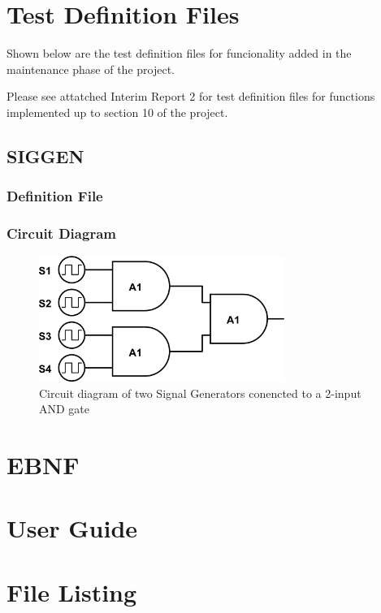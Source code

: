 \documentclass[a4paper,10pt]{article}
\begin{document}
\section{Test Definition Files}

Shown below are the test definition files for funcionality added in the maintenance phase of the project.

Please see attatched Interim Report 2 for test definition files for functions implemented up to section 10 of the project.

\subsection{SIGGEN}

\subsubsection{Definition File}


\subsubsection{Circuit Diagram}
\begin{figure}[h]
 \centering
 \includegraphics[width=8cm]{../../examples/siggen.png}
 \caption{Circuit diagram of two Signal Generators conencted to a 2-input AND gate}
 \label{fig:example-xor}
\end{figure}

\pagebreak

\section{EBNF}

\pagebreak

\section{User Guide}

\pagebreak

\section{File Listing}
\end{document}
